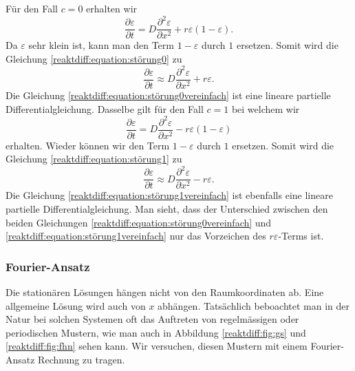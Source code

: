 Für den Fall \(c = 0\) erhalten wir
\begin{equation}
\label{reaktdiff:equation:störung0}
\frac{\partial \varepsilon}{\partial t} = D \frac{\partial^2 \varepsilon}{\partial x^2} + r\varepsilon(1-\varepsilon).
\end{equation}
Da \(\varepsilon\) sehr klein ist, kann man den Term \(1-\varepsilon\) durch \(1\) ersetzen.
Somit wird die Gleichung \eqref{reaktdiff:equation:störung0} zu
\begin{equation}
\label{reaktdiff:equation:störung0vereinfach}
\frac{\partial \varepsilon}{\partial t} \approx D \frac{\partial^2 \varepsilon}{\partial x^2}  + r\varepsilon.
\end{equation}
Die Gleichung \eqref{reaktdiff:equation:störung0vereinfach} ist eine lineare partielle Differentialgleichung.
Dasselbe gilt für den Fall \(c = 1\) bei welchem wir
\begin{equation}
\label{reaktdiff:equation:störung1}
\frac{\partial \varepsilon}{\partial t} = D \frac{\partial^2 \varepsilon}{\partial x^2} - r\varepsilon(1-\varepsilon)
\end{equation}
erhalten.
Wieder können wir den Term \(1-\varepsilon\) durch \(1\) ersetzen.
Somit wird die Gleichung \eqref{reaktdiff:equation:störung1} zu
\begin{equation}
\label{reaktdiff:equation:störung1vereinfach}
\frac{\partial \varepsilon}{\partial t} \approx D \frac{\partial^2 \varepsilon}{\partial x^2} - r\varepsilon.
\end{equation}
Die Gleichung \eqref{reaktdiff:equation:störung1vereinfach} ist ebenfalls eine lineare partielle Differentialgleichung.
Man sieht, dass der Unterschied zwischen den beiden Gleichungen \eqref{reaktdiff:equation:störung0vereinfach} und \eqref{reaktdiff:equation:störung1vereinfach} nur das Vorzeichen des \(r \varepsilon\)-Terms ist.

\subsubsection{Fourier-Ansatz}
Die stationären Lösungen hängen nicht von den Raumkoordinaten ab.
Eine allgemeine Lösung wird auch von \(x\) abhängen.
Tatsächlich beboachtet man in der Natur bei solchen Systemen oft
das Auftreten von regelmässigen oder periodischen Mustern, wie man
auch in Abbildung \ref{reaktdiff:fig:gs} und \ref{reaktdiff:fig:fhn}
sehen kann.
Wir versuchen, diesen Mustern mit einem Fourier-Ansatz Rechnung zu tragen.
%

